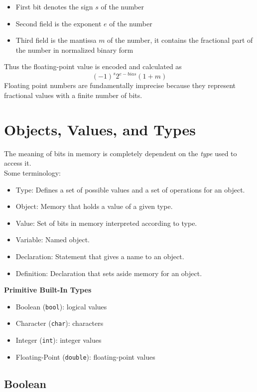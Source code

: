 \documentclass{article}
\begin{document}
	\begin{itemize}
		\item First bit denotes the sign $ s $ of the number
		\item Second field is the exponent $ e $ of the number
		\item Third field is the mantissa $ m $ of the number, it contains the fractional part of the number in normalized binary form
	\end{itemize}
	Thus the floating-point value is encoded and calculated as 
	\[
		(-1)^s 2^{e-bias} (1+m)
	\]
	Floating point numbers are fundamentally imprecise because they represent fractional values with a finite number of bits.

	
	\section{Objects, Values, and Types}
	
	The meaning of bits in memory is completely dependent on the \textit{type} used to access it.\\
	
	Some terminology:
	
	\begin{itemize}
		\item Type: Defines a set of possible values and a set of operations for an object.
		\item Object: Memory that holds a value of a given type.
		\item Value: Set of bits in memory interpreted according to type.
		\item Variable: Named object.
		\item Declaration: Statement that gives a name to an object.
		\item Definition: Declaration that sets aside memory for an object.
	\end{itemize}
	
	\textbf{Primitive Built-In Types}
	
	\begin{itemize}
		\item Boolean (\verb|bool|): logical values
		\item Character (\verb|char|): characters
		\item Integer (\verb|int|): integer values
		\item Floating-Point (\verb|double|): floating-point values
	\end{itemize}
	
	\subsection{Boolean}
	
\end{document}
